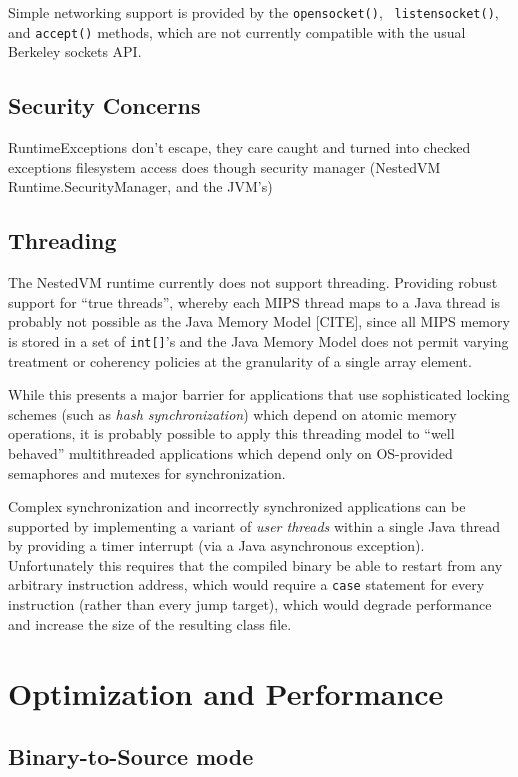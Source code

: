 \documentclass{acmconf}
\begin{document}
Simple networking support is provided by the {\tt opensocket()}, {\tt
listensocket()}, and {\tt accept()} methods, which are not currently
compatible with the usual Berkeley sockets API.


\subsection{Security Concerns}

RuntimeExceptions don't escape, they care caught and turned into
checked exceptions filesystem access does though security manager
(NestedVM Runtime.SecurityManager, and the JVM's)


\subsection{Threading}

The NestedVM runtime currently does not support threading.  Providing
robust support for ``true threads'', whereby each MIPS thread maps to
a Java thread is probably not possible as the Java Memory Model
[CITE], since all MIPS memory is stored in a set of {\tt int[]}'s and
the Java Memory Model does not permit varying treatment or coherency
policies at the granularity of a single array element.

While this presents a major barrier for applications that use
sophisticated locking schemes (such as {\it hash synchronization})
which depend on atomic memory operations, it is probably possible to
apply this threading model to ``well behaved'' multithreaded
applications which depend only on OS-provided semaphores and mutexes
for synchronization.

Complex synchronization and incorrectly synchronized applications can
be supported by implementing a variant of {\it user threads} within a
single Java thread by providing a timer interrupt (via a Java
asynchronous exception).  Unfortunately this requires that the
compiled binary be able to restart from any arbitrary instruction
address, which would require a {\tt case} statement for every
instruction (rather than every jump target), which would degrade
performance and increase the size of the resulting class file.

\section{Optimization and Performance}

\subsection{Binary-to-Source mode}
\end{document}
